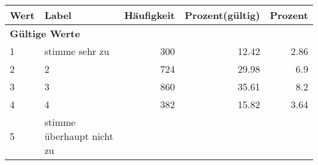      \begin{longtable}{lXrrr}
     \toprule
     \textbf{Wert} & \textbf{Label} & \textbf{Häufigkeit} & \textbf{Prozent(gültig)} & \textbf{Prozent} \\
     \endhead
     \midrule
     \multicolumn{5}{l}{\textbf{Gültige Werte}}\\

     1 &
     \multicolumn{1}{X}{ stimme sehr zu   } &


       \num{300} &
       \num[round-mode=places,round-precision=2]{12,42} &
         \num[round-mode=places,round-precision=2]{2,86} \\

     2 &
     \multicolumn{1}{X}{ 2   } &


       \num{724} &
       \num[round-mode=places,round-precision=2]{29,98} &
         \num[round-mode=places,round-precision=2]{6,9} \\

     3 &
     \multicolumn{1}{X}{ 3   } &


       \num{860} &
       \num[round-mode=places,round-precision=2]{35,61} &
         \num[round-mode=places,round-precision=2]{8,2} \\

     4 &
     \multicolumn{1}{X}{ 4   } &


       \num{382} &
       \num[round-mode=places,round-precision=2]{15,82} &
         \num[round-mode=places,round-precision=2]{3,64} \\

     5 &
     \multicolumn{1}{X}{ stimme überhaupt nicht zu   } &



\end{longtable}
